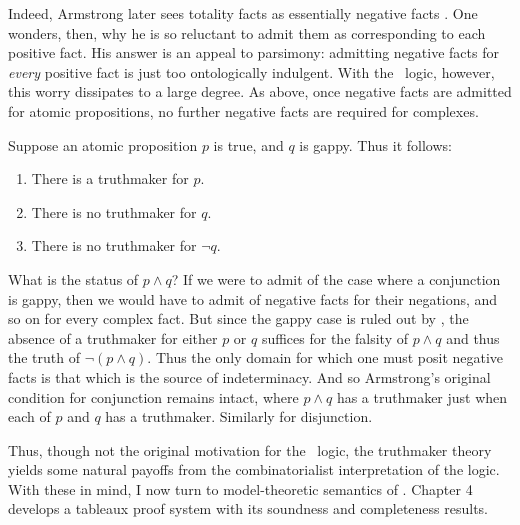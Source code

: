 Indeed, Armstrong later sees totality facts as essentially negative facts \cite[p. 153]{Armstrong:2000}. One wonders, then, why he is so reluctant to admit them as corresponding to each positive fact. His answer is an appeal to parsimony: admitting negative facts for \emph{every} positive fact is just too ontologically indulgent. With the \GO\ logic, however, this worry dissipates to a large degree. As above, once negative facts are admitted for atomic propositions, no further negative facts are required for complexes. 

Suppose an atomic proposition $p$ is true, and $q$ is gappy. Thus it follows:

\begin{singlespace}
\begin{enumerate}
\item There is a truthmaker for $p$.
\item There is no truthmaker for $q$.
\item There is no truthmaker for $\neg q$.
\end{enumerate}
\end{singlespace}

What is the status of $p \wedge q$? If we were to admit of the case where a conjunction is gappy, then we would have to admit of negative facts for their negations, and so on for every complex fact. But since the gappy case is ruled out by \GO, the absence of a truthmaker for either $p$ or $q$ suffices for the falsity of $p\wedge q$ and thus the truth of $\neg(p\wedge q)$. Thus the only domain for which one must posit negative facts is that which is the source of indeterminacy. And so Armstrong's original condition for conjunction remains intact, where $p \wedge q$ has a truthmaker just when each of $p$ and $q$ has a truthmaker. Similarly for disjunction.

Thus, though not the original motivation for the \GO\ logic, the truthmaker theory yields some natural payoffs from the combinatorialist interpretation of the logic. With these in mind, I now turn to model-theoretic semantics of \GoModal. Chapter 4 develops a tableaux proof system with its soundness and completeness results.

\section{\GoModal}\label{goModal}

